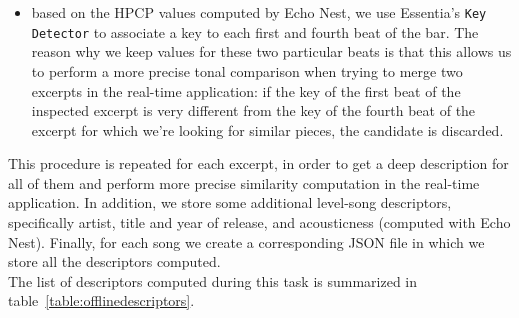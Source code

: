 \begin{itemize}
\item based on the HPCP values computed by Echo Nest, we use Essentia's \texttt{Key Detector} to associate a key to each first and fourth beat of the bar. The reason why we keep values for these two particular beats is that this allows us to perform a more precise tonal comparison when trying to merge two excerpts in the real-time application: if the key of the first beat of the inspected excerpt is very different from the key of the fourth beat of the excerpt for which we're looking for similar pieces, the candidate is discarded.
\end{itemize} 
This procedure is repeated for each excerpt, in order to get a deep description for all of them and perform more precise similarity computation in the real-time application. In addition, we store some additional level-song descriptors, specifically artist, title and year of release, and acousticness (computed with Echo Nest). Finally, for each song we create a corresponding JSON file in which we store all the descriptors computed. \\
The list of descriptors computed during this task is summarized in table~\ref{table:offlinedescriptors}.

